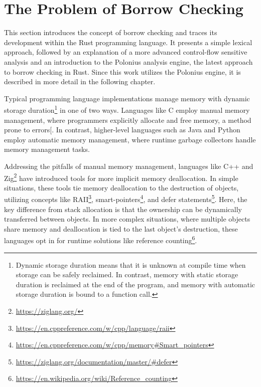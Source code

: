 \documentclass[
  11pt,
  twoside]{report}
\DeclareRobustCommand{\href}[2]{#2\footnote{\url{#1}}}
\begin{document}
\chapter{The Problem of Borrow
Checking}\label{sec:the-problem-of-borrow-checking}

This section introduces the concept of borrow checking and traces its
development within the Rust programming language. It presents a simple
lexical approach, followed by an explanation of a more advanced
control-flow sensitive analysis and an introduction to the Polonius
analysis engine, the latest approach to borrow checking in Rust. Since
this work utilizes the Polonius engine, it is described in more detail
in the following chapter.

Typical programming language implementations manage memory with dynamic
storage duration\footnote{Dynamic storage duration means that it is
  unknown at compile time when storage can be safely reclaimed. In
  contrast, memory with static storage duration is reclaimed at the end
  of the program, and memory with automatic storage duration is bound to
  a function call.} in one of two ways. Languages like C employ manual
memory management, where programmers explicitly allocate and free
memory, a method prone to errors{[}\citeproc{ref-nsa}{5}{]}. In
contrast, higher-level languages such as Java and Python employ
automatic memory management, where runtime garbage collectors handle
memory management tasks.

Addressing the pitfalls of manual memory management, languages like C++
and \href{https://ziglang.org/}{Zig} have introduced tools for more
implicit memory deallocation. In simple situations, these tools tie
memory deallocation to the destruction of objects, utilizing concepts
like \href{https://en.cppreference.com/w/cpp/language/raii}{RAII},
\href{https://en.cppreference.com/w/cpp/memory\#Smart_pointers}{smart-pointers},
and \href{https://ziglang.org/documentation/master/\#defer}{defer
statements}. Here, the key difference from stack allocation is that the
ownership can be dynamically transferred between objects. In more
complex situations, where multiple objects share memory and deallocation
is tied to the last object's destruction, these languages opt in for
runtime solutions like
\href{https://en.wikipedia.org/wiki/Reference_counting}{reference
counting}.
\end{document}
